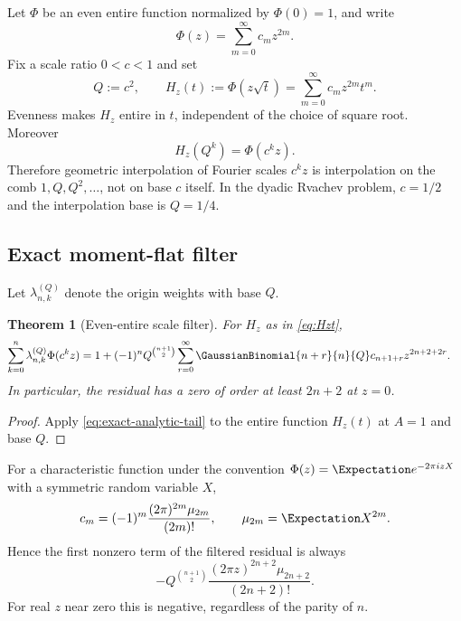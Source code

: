 \documentclass[11pt,oneside]{article}
\numberwithin{equation}{section}
\newtheorem{theorem}{Theorem}[section]
\theoremstyle{definition}
\theoremstyle{remark}
\begin{document}
Let $\Phi$ be an even entire function normalized by $\Phi(0)=1$, and write
\begin{equation}
 \Phi(z)=\sum_{m=0}^{\infty}c_mz^{2m}.
 \label{eq:Phi-even}
\end{equation}
Fix a scale ratio $0<c<1$ and set
\begin{equation}
 Q:=c^2,\qquad H_z(t):=\Phi(z\sqrt t)
 =\sum_{m=0}^{\infty}c_mz^{2m}t^m.
 \label{eq:Hzt}
\end{equation}
Evenness makes $H_z$ entire in $t$, independent of the choice of square root.
Moreover
\begin{equation}
 H_z(Q^k)=\Phi(c^kz).
 \label{eq:scale-samples}
\end{equation}
Therefore geometric interpolation of Fourier scales $c^kz$ is interpolation on
the comb $1,Q,Q^2,\ldots$, not on base $c$ itself.  In the dyadic Rvachev
problem, $c=1/2$ and the interpolation base is $Q=1/4$.

\subsection{Exact moment-flat filter}

Let $\lambda_{n,k}^{(Q)}$ denote the origin weights with base $Q$.

\begin{theorem}[Even-entire scale filter]
For $H_z$ as in \eqref{eq:Hzt},
\begin{align}
 \sum_{k=0}^n\lambda_{n,k}^{(Q)}\Phi(c^kz)
 &=1+(-1)^nQ^{\binom{n+1}{2}}
 \sum_{r=0}^{\infty}\GaussianBinomial{n+r}{n}{Q}
 c_{n+1+r}z^{2n+2+2r}.
 \label{eq:even-entire-filter}
\end{align}
In particular, the residual has a zero of order at least $2n+2$ at $z=0$.
\end{theorem}

\begin{proof}
Apply \eqref{eq:exact-analytic-tail} to the entire function $H_z(t)$ at
$A=1$ and base $Q$.
\end{proof}

For a characteristic function under the convention
$\Phi(z)=\Expectation e^{-2\pi izX}$ with a symmetric random variable $X$,
\begin{equation}
 c_m=(-1)^m\frac{(2\pi)^{2m}\mu_{2m}}{(2m)!},
 \qquad \mu_{2m}=\Expectation X^{2m}.
 \label{eq:Fourier-coeff-moments}
\end{equation}
Hence the first nonzero term of the filtered residual is always
\begin{equation}
 -Q^{\binom{n+1}{2}}
 \frac{(2\pi z)^{2n+2}\mu_{2n+2}}{(2n+2)!}.
 \label{eq:leading-Fourier-residual}
\end{equation}
For real $z$ near zero this is negative, regardless of the parity of $n$.
\end{document}
